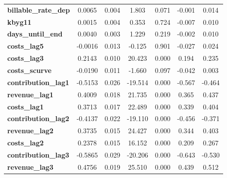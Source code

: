 \begin{center}
\begin{tabular}{lcccccc}
\textbf{billable\_rate\_dep}                &       0.0065  &        0.004     &     1.803  &         0.071        &       -0.001    &        0.014     \\
\textbf{kbyg11}                             &       0.0015  &        0.004     &     0.353  &         0.724        &       -0.007    &        0.010     \\
\textbf{days\_until\_end}                   &       0.0040  &        0.003     &     1.229  &         0.219        &       -0.002    &        0.010     \\
\textbf{costs\_lag5}                        &      -0.0016  &        0.013     &    -0.125  &         0.901        &       -0.027    &        0.024     \\
\textbf{costs\_lag3}                        &       0.2143  &        0.010     &    20.423  &         0.000        &        0.194    &        0.235     \\
\textbf{costs\_scurve}                      &      -0.0190  &        0.011     &    -1.660  &         0.097        &       -0.042    &        0.003     \\
\textbf{contribution\_lag1}                 &      -0.5153  &        0.026     &   -19.514  &         0.000        &       -0.567    &       -0.464     \\
\textbf{revenue\_lag1}                      &       0.4009  &        0.018     &    21.735  &         0.000        &        0.365    &        0.437     \\
\textbf{costs\_lag1}                        &       0.3713  &        0.017     &    22.489  &         0.000        &        0.339    &        0.404     \\
\textbf{contribution\_lag2}                 &      -0.4137  &        0.022     &   -19.110  &         0.000        &       -0.456    &       -0.371     \\
\textbf{revenue\_lag2}                      &       0.3735  &        0.015     &    24.427  &         0.000        &        0.344    &        0.403     \\
\textbf{costs\_lag2}                        &       0.2378  &        0.015     &    16.152  &         0.000        &        0.209    &        0.267     \\
\textbf{contribution\_lag3}                 &      -0.5865  &        0.029     &   -20.206  &         0.000        &       -0.643    &       -0.530     \\
\textbf{revenue\_lag3}                      &       0.4756  &        0.019     &    25.510  &         0.000        &        0.439    &        0.512     \\

\end{tabular}
\end{center}
